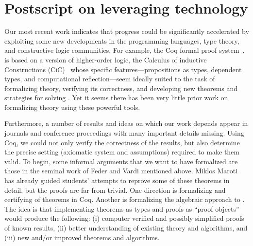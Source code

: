 \section*{Postscript on leveraging technology}
Our most recent work indicates that progress could be significantly accelerated
by exploiting some new developments in the programming
languages, type theory, and constructive logic communities.
For example, the Coq formal proof system~\cite{MR2229784}, is based on a version of
higher-order logic, the Calculus of inductive Constructions (CiC)~\cite{MR935892} whose
specific features---propositions as types, dependent types,
and computational reflection---seem ideally suited to the task of formalizing \csp theory,
verifying its correctness, and developing new
theorems and strategies for solving \csps. Yet
it seems there has been very little prior work on formalizing \csp theory 
using these powerful tools.

Furthermore, a number of results and ideas on which our work depends
appear in journals and conference proceedings with many important details
missing.  Using Coq, we could not only verify the correctness of the results, but
also determine the precise setting (axiomatic system and assumptions) 
required to make them valid.  To begin, some informal arguments that we
want to have formalized are those in the seminal work of Feder and Vardi mentioned
above.  Miklos Maroti has already guided students' attempts to reprove some of
these theorems in detail,  but the
proofs are far from trivial. One direction is formalizing and
certifying of theorems in Coq. Another is formalizing the algebraic
approach to \csp.  The idea is that implementing theorems as types
and proofs as ``proof objects'' would produce the following:
(i) computer verified and possibly simplified proofs of known results,
(ii) better understanding of existing theory and algorithms, and
(iii) new and/or improved theorems and algorithms.

